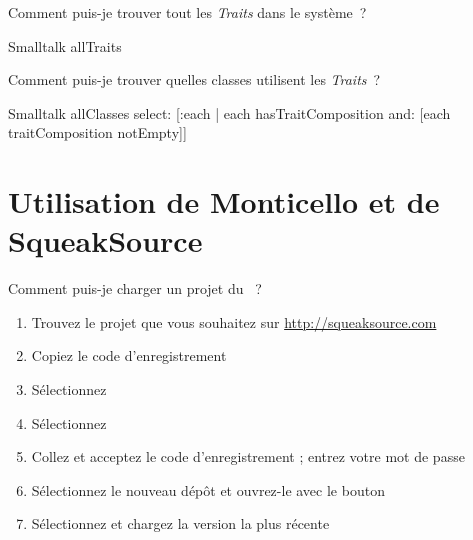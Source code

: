 \documentclass[a4paper,10pt,twoside]{book}
\begin{document}
\begin{faq}
Comment puis-je trouver tout les \emph{Traits} dans le système~?
\end{faq}
\answer
\begin{code}{}
Smalltalk allTraits
\end{code}

\begin{faq}
Comment puis-je trouver quelles classes utilisent les \emph{Traits}~?
\end{faq}
\answer
\begin{code}{}
Smalltalk allClasses select: [:each | each hasTraitComposition and: [each traitComposition notEmpty]]
\end{code}

\section{Utilisation de Monticello et de SqueakSource}

\begin{faq}
Comment puis-je charger un projet du ~?
\end{faq}
\answer
\begin{enumerate}
  \item Trouvez le projet que vous souhaitez sur \url{http://squeaksource.com}
  \item Copiez le code d'enregistrement
  \item Sélectionnez 
  \item Sélectionnez 
  \item Collez et acceptez le code d'enregistrement ; entrez votre mot de passe
  \item Sélectionnez le nouveau dépôt et ouvrez-le avec le bouton 
  \item Sélectionnez et chargez la version la plus récente
\end{enumerate}
\end{document}

